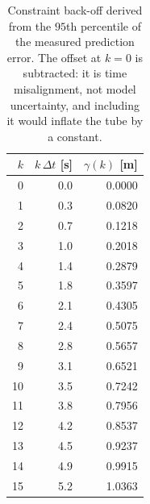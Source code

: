 \begin{table}[htbp]
  \centering
  \small
  \caption{Constraint back-off derived from the $95$th percentile of the measured prediction error. The offset at $k=0$ is subtracted: it is time misalignment, not model uncertainty, and including it would inflate the tube by a constant.}
  \label{res:tab:beta}
  \begin{tabular}{rrr}
    \toprule
    $k$ & $k\,\Delta t$ [s] & $\gamma(k)$ [m] \\
    \midrule
    0 & 0.0 & 0.0000 \\
    1 & 0.3 & 0.0820 \\
    2 & 0.7 & 0.1218 \\
    3 & 1.0 & 0.2018 \\
    4 & 1.4 & 0.2879 \\
    5 & 1.8 & 0.3597 \\
    6 & 2.1 & 0.4305 \\
    7 & 2.4 & 0.5075 \\
    8 & 2.8 & 0.5657 \\
    9 & 3.1 & 0.6521 \\
    10 & 3.5 & 0.7242 \\
    11 & 3.8 & 0.7956 \\
    12 & 4.2 & 0.8537 \\
    13 & 4.5 & 0.9237 \\
    14 & 4.9 & 0.9915 \\
    15 & 5.2 & 1.0363 \\
    \bottomrule
  \end{tabular}
\end{table}

